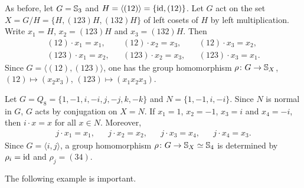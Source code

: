 \begin{example}
As before, let $G=\mathbb{S}_3$ and $H=\langle (12)\rangle=\{\operatorname{id},(12)\}$. Let $G$ act on the set $X=G/H=\{H,(123
)H,(132)H\}$ of left cosets of $H$ by left multiplication. Write 
$x_1=H$, $x_2=(123)H$ and $x_3=(132)H$. Then
\begin{align*}
(12)\cdot x_1=x_1,&& (12)\cdot x_2=x_3, && (12)\cdot x_3=x_2,\\
(123)\cdot x_1=x_2, && (123)\cdot x_2=x_3, &&(123)\cdot x_3=x_1.
\end{align*}
Since $G=\langle (12),(123)\rangle$, one has the group
homomorphism 
$\rho\colon G\to\mathbb{S}_{X}$, $(12)\mapsto (x_2x_3)$, $(123)\mapsto (x_1x_2x_3)$.
\end{example}


\begin{example}
Let $G=Q_8=\{1,-1,i,-i,j,-j,k,-k\}$ and $N=\{1,-1,i,-i\}$. Since
$N$ is normal in $G$, $G$
acts by conjugation on $X=N$.
If $x_1=1$, $x_2=-1$, $x_3=i$ and $x_4=-i$, then
$i\cdot x=x$ for all $x\in N$. Moreover, 
\begin{align*}
j\cdot x_1=x_1, && j\cdot x_2=x_2, && j\cdot x_3=x_4, && j\cdot x_4=x_3.
\end{align*}
Since $G=\langle i,j\rangle$, a group homomorphism $\rho\colon G\to\mathbb{S}_X\simeq\mathbb{S}_4$ is determined by 
$\rho_i=\operatorname{id}$ and $\rho_j=(34)$.
\end{example}

The following example is important. 


